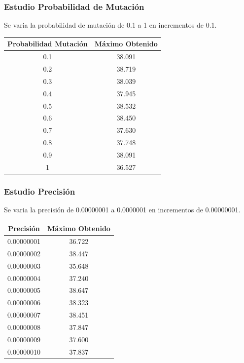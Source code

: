 \documentclass[12pt]{article}
\begin{document}
\subsubsection*{Estudio Probabilidad de Mutación}
	Se varia la probabilidad de mutación de 0.1 a 1 en incrementos de 0.1.
\begin{table}[H]
\begin{center}
\begin{tabular}{|cc|} \hline
Probabilidad Mutación & Máximo Obtenido \\  \hline
0.1 & 38.091 \\ 
0.2 & 38.719 \\ 
0.3 & 38.039 \\
0.4 & 37.945 \\
0.5 & 38.532 \\
0.6 & 38.450 \\
0.7 & 37.630 \\
0.8 & 37.748 \\ 
0.9 & 38.091 \\
1   & 36.527 \\  \hline
\end{tabular}
\end{center}
\end{table}
\subsubsection*{Estudio Precisión}
	Se varia la precisión de 0.00000001 a 0.0000001 en incrementos de 0.00000001.
\begin{table}[H]
\begin{center}
\begin{tabular}{|cc|} \hline
Precisión & Máximo Obtenido \\  \hline
0.00000001 & 36.722 \\ 
0.00000002 & 38.447 \\ 
0.00000003 & 35.648 \\
0.00000004 & 37.240 \\
0.00000005 & 38.647 \\
0.00000006 & 38.323 \\
0.00000007 & 38.451\\
0.00000008 & 37.847 \\ 
0.00000009 & 37.600 \\
0.00000010 & 37.837 \\  \hline
\end{tabular}
\end{center}
\end{table}


	
\end{document}
